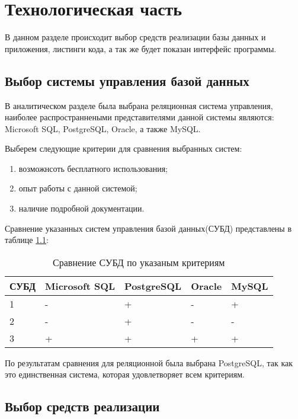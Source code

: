 \chapter{Технологическая часть}

В данном разделе происходит выбор средств 
реализации базы данных и приложения, 
листинги кода, а так же будет показан интерфейс программы.


\section{Выбор системы управления базой данных}

В аналитическом разделе была выбрана реляционная 
система управления, наиболее распространнеными представителями
данной системы являются: 
Microsoft SQL, PostgreSQL, Oracle, а также MySQL. 

Выберем следующие критерии для сравнения выбранных систем:
\begin{enumerate}
    \item[1)] возможнсоть бесплатного использования;
    \item[2)] опыт работы с данной системой;
    \item[3)] наличие подробной документации. 
\end{enumerate}

Сравнение указанных систем управления базой данных(СУБД)
представлены в таблице \ref{tab:diff}:

\begin{table}[!ht]
    \centering
    \caption{\label{tab:diff} Сравнение СУБД по указаным критериям}
    \begin{tabular}{|l|l|l|l|l|}
    \hline
        СУБД & Microsoft SQL & PostgreSQL & Oracle & MySQL \\ \hline
        1 & - & + & - & +  \\ \hline
        2 & - & + & - & -  \\ \hline
        3 & + & + & + & +  \\ \hline
    \end{tabular}
\end{table}

По результатам сравнения для реляционной была выбрана PostgreSQL, так как это 
единственная система, которая удовлетворяет всем критериям.

\section{Выбор средств реализации}


